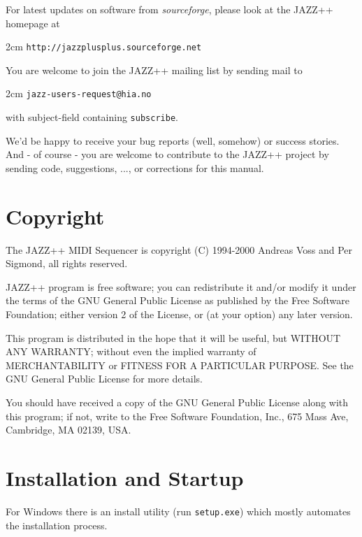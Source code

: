 \documentclass[letterpaper]{report}
\begin{document}
For latest updates on software from {\em sourceforge}, please look at the
JAZZ++ homepage at

\begin{indented}{2cm}
{\tt http://jazzplusplus.sourceforge.net}
\end{indented}

You are welcome to join the JAZZ++ mailing list by sending mail to

\begin{indented}{2cm}
{\tt jazz-users-request@hia.no}
\end{indented}

with subject-field containing {\tt subscribe}.

We'd be happy to receive your bug reports (well, somehow) or success
stories. And - of course - you are welcome to contribute to the JAZZ++
project by sending code, suggestions, ..., or corrections for this
manual.



\section{Copyright}\label{copyright}

The JAZZ++ MIDI Sequencer is copyright (C) 1994-2000 Andreas Voss and
Per Sigmond, all rights reserved.

JAZZ++ program is free software; you can redistribute it and/or modify
it under the terms of the GNU General Public License as published by
the Free Software Foundation; either version 2 of the License, or
(at your option) any later version.

This program is distributed in the hope that it will be useful,
but WITHOUT ANY WARRANTY; without even the implied warranty of
MERCHANTABILITY or FITNESS FOR A PARTICULAR PURPOSE.  See the
GNU General Public License for more details.

You should have received a copy of the GNU General Public License
along with this program; if not, write to the Free Software
Foundation, Inc., 675 Mass Ave, Cambridge, MA 02139, USA.




\section{Installation and Startup}\label{installation}

For Windows there is an install utility (run {\tt setup.exe}) which
mostly automates the installation process.
\end{document}
